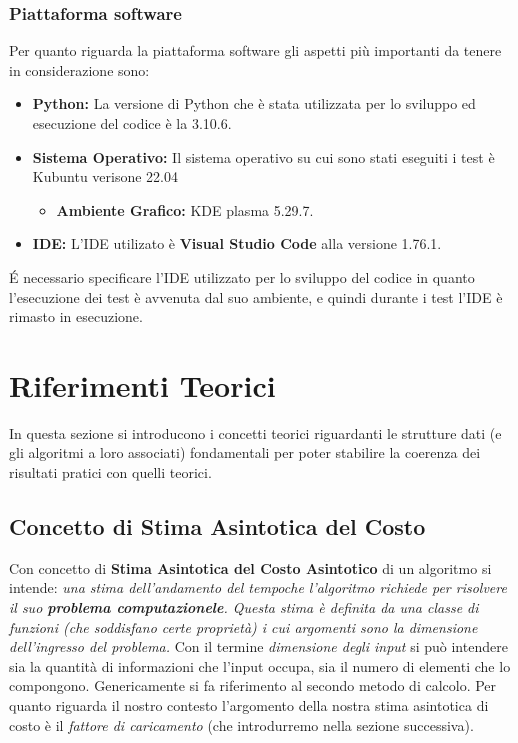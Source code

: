 \documentclass{article}
\begin{document}
\subsubsection{Piattaforma software}

Per quanto riguarda la piattaforma software gli aspetti più importanti da tenere in considerazione sono:
\begin{itemize}
\item \textbf{Python:} La versione di Python che è stata utilizzata per lo sviluppo ed esecuzione del codice è la 3.10.6.
\item \textbf{Sistema Operativo:} Il sistema operativo su cui sono stati eseguiti i test è Kubuntu verisone 22.04
\begin{itemize}
\item \textbf{Ambiente Grafico:} KDE plasma 5.29.7.
\end{itemize}
\item \textbf{IDE:} L'IDE utilizato è \textbf{Visual Studio Code} alla versione 1.76.1.
\end{itemize}
\'E necessario specificare l'IDE utilizzato per lo sviluppo del codice in quanto l'esecuzione dei test è avvenuta dal suo ambiente, e quindi durante i test l'IDE è rimasto in esecuzione. 
\section{Riferimenti Teorici}

In questa sezione si introducono i concetti teorici riguardanti le strutture dati (e gli algoritmi a loro associati) fondamentali per poter stabilire la coerenza dei risultati pratici con quelli teorici. 
\subsection{Concetto di Stima Asintotica del Costo}

Con concetto di \textbf{Stima Asintotica  del Costo Asintotico} di un algoritmo si intende: \emph{una stima dell'andamento del tempoche l'algoritmo richiede per risolvere il suo \textbf{problema computazionele}. Questa stima è definita da una classe di funzioni (che soddisfano certe proprietà) i cui argomenti sono la dimensione dell'ingresso del problema.}
Con il termine \emph{dimensione degli input} si può intendere sia la quantità di informazioni che l'input occupa, sia il numero di elementi che lo compongono. Genericamente si fa riferimento al secondo metodo di calcolo. Per quanto riguarda il nostro contesto l'argomento della nostra stima asintotica di costo è il \emph{fattore di caricamento} (che introdurremo nella sezione successiva).
\end{document}
